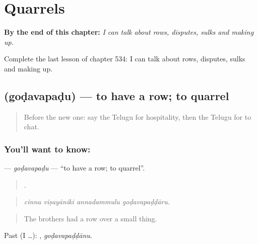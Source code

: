 
\chapter{Quarrels}
\label{ch:te-quarrels}

\begin{chapteropening}
\textbf{By the end of this chapter:} \emph{I can talk about rows, disputes, sulks and making up.}

Complete the last lesson of chapter 534: I can talk about rows, disputes, sulks and making up.
\end{chapteropening}

\section[\texorpdfstring{\te{గొడవపడు} (goḍavapaḍu)}{గొడవపడు (goḍavapaḍu)}]{ (goḍavapaḍu) — to have a row; to quarrel}

\label{lesson:TE-C534-godavapadu}



\begin{quote}
Before the new one: say the Telugu for hospitality, then the Telugu for to chat.
\end{quote}

\subsection*{You'll want to know: }
\textbf{} — \emph{goḍavapaḍu} — \textquotedblleft{}to have a row; to quarrel\textquotedblright{}.

\begin{quote}
   .
\end{quote}

\begin{quote}
\emph{cinna viṣayāniki annadammulu goḍavapaḍḍāru.}
\end{quote}

\begin{quote}
The brothers had a row over a small thing.
\end{quote}

Past (I …): , \emph{goḍavapaḍḍānu}.

